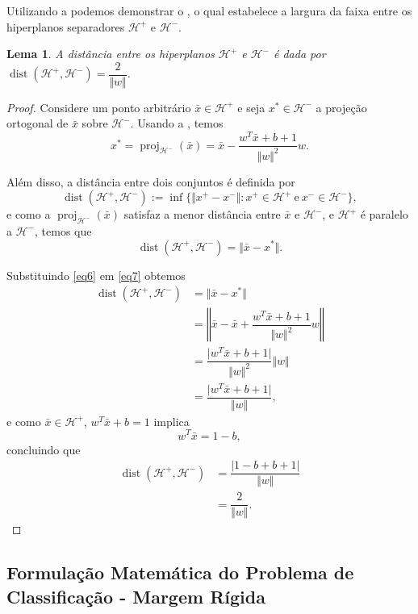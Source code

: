 \documentclass[12pt,a4paper]{scrartcl}
\DeclareMathOperator{\proj}{proj}
\DeclareMathOperator{\dist}{dist}
\def\Hset{\mathcal{H}}
\def\xbar{\bar{x}}
\newtheorem{lema}{Lema}
\theoremstyle{definition}%
\begin{document}
Utilizando a  podemos demonstrar o , o qual estabelece a largura da faixa entre os hiperplanos separadores $\Hset^{+}$ e $\Hset^{-}$.

\begin{lema} \label{lema2} A distância entre os hiperplanos $\Hset^{+}$ e $\Hset^{-}$ é dada por $\dist(\Hset^{+}, \Hset^{-})=\dfrac{2}{\Vert w\Vert}$. 
\end{lema}
\begin{proof}
Considere um ponto arbitrário $\xbar\in \Hset^{+}$ e seja $x^{*}\in \Hset^{-}$ a projeção ortogonal de $\xbar$ sobre $\Hset^{-}$. Usando a , temos
\[ \label{eq6} x^{*}= \proj_{\Hset^{-}}(\xbar)= \xbar - \dfrac{w^{T}\xbar+b+1}{\Vert w\Vert^{2}}w. \] 

Além disso, a distância entre dois conjuntos é definida por
\[ \dist(\Hset^{+}, \Hset^{-}):= \inf\{\Vert x^{+}-x^{-} \Vert : x^{+}\in \Hset^{+} \ \text{e} \ x^{-}\in \Hset^{-}\},
\]
e como a $\proj_{\Hset^{-}}(\xbar)$ satisfaz a menor distância entre $\xbar$ e $\Hset^{-}$, e $\Hset^{+}$ é paralelo a $\Hset^{-}$, temos que 
\[ \label{eq7} \dist(\Hset^{+},\Hset^{-})=\Vert \xbar-x^{*}\Vert. \]

Substituindo \eqref{eq6} em \eqref{eq7} obtemos
\begin{align} 
\dist(\Hset^{+},\Hset^{-}) &= \Vert \xbar-x^{*}\Vert \\
&= \left\Vert \xbar -\xbar +\dfrac{w^{T}\xbar+b+1}{\Vert w\Vert^{2}}w \right\Vert \\
&=  \dfrac{\vert w^{T}\xbar+b+1 \vert}{\Vert w\Vert^{2}} \Vert w\Vert \\
&= \dfrac{\vert w^{T}\xbar+b+1 \vert}{\Vert w\Vert},
\end{align}
e como $\xbar\in \Hset^{+}$,  $ w^{T}\xbar+b=1$ implica
\[  w^{T}\xbar =1-b, \]
concluindo que 
\begin{align} 
\dist(\Hset^{+},\Hset^{-})&= \dfrac{\vert 1-b+b+1 \vert}{\Vert w\Vert} \\
&= \dfrac{2}{\Vert w\Vert }. 
\end{align}
\end{proof}


\subsection{Formulação Matemática do Problema de Classificação - Margem Rígida}
\end{document}
